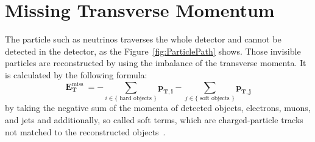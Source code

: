 \section{Missing Transverse Momentum}
The particle such as neutrinos traverses the whole detector and cannot be detected in the detector, as the Figure~\ref{fig:ParticlePath} shows. 
Those invisible particles are reconstructed by using the imbalance of the transverse momenta. 
It is calculated by the following formula:
\begin{equation}
\mathbf{E}_{\mathbf{T}}^{\text {miss }}=-\sum_{i \in\{\text { hard objects }\}} \mathbf{p}_{\mathbf{T}, \mathbf{i}}-\sum_{j \in\{\text { soft objects }\}} \mathbf{p_{T,\mathbf{j}}}
\end{equation}
by taking the negative sum of the momenta of detected objects, electrons, muons, and jets and additionally, so called soft terms, which are charged-particle tracks not matched to the reconstructed objects~\cite{PERF-2016-07}.